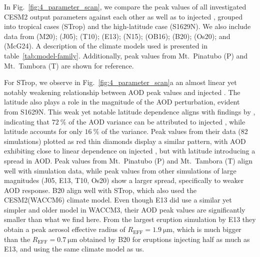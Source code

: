 \documentclass[draft]{agujournal2019}
\begin{document}
  In Fig.~\ref{fig:4_parameter_scan}, we compare the peak values of all investigated
  CESM2 output parameters against each other as well as to injected , grouped
  into tropical cases (STrop) and the high-latitude case (S1629N). We also include data
  from  (M20);  (J05);  (T10);
   (E13);  (N15); 
  (OB16);  (B20);  (Os20); and 
  (McG24). A description of the climate models used is presented in
  table~\ref{tab:model-family}. Additionally, peak values from Mt.\ Pinatubo (P) and
  Mt.\ Tambora (T) are shown for reference.

  For STrop, we observe in Fig.~\ref{fig:4_parameter_scan}a an almost linear yet notably
  weakening relationship between AOD peak values and injected . The latitude
  also plays a role in the magnitude of the AOD perturbation, evident from S1629N. This
  weak yet notable latitude dependence aligns with findings by ,
  indicating that \(\SI{72}{\percent}\) of the AOD variance can be attributed to
  injected , while latitude accounts for only \(\SI{16}{\percent}\) of the
  variance. Peak values from their data (82 simulations) plotted as red thin diamonds
  display a similar pattern, with AOD exhibiting close to linear dependence on injected
  , but with latitude introducing a spread in AOD. Peak values from
  Mt.\ Pinatubo (P) and Mt.\ Tambora (T) align well with simulation data, while peak
  values from other simulations of large  magnitudes (J05, E13, T10, Os20) show
  a larger spread, specifically to weaker AOD response. B20 align well with STrop, which
  also used the CESM2(WACCM6) climate model. Even though E13 did use a similar yet
  simpler and older model in WACCM3, their AOD peak values are significantly smaller
  than what we find here. From the largest eruption simulation by E13 they obtain a peak
  aerosol effective radius of \(R_{\mathrm{EFF}}=\SI{1.9}{\micro\meter}\), which is much
  bigger than the \(R_{\mathrm{EFF}}=\SI{0.7}{\micro\meter}\) obtained by B20 for
  eruptions injecting half as much  as E13, and using the same climate model as
  us.
\end{document}
